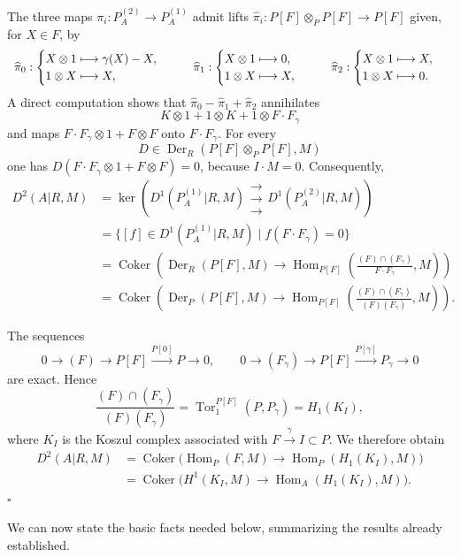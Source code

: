 The three maps
$\pi_i:P_A^{(2)}\longrightarrow P_A^{(1)}$ admit lifts
$\widehat\pi_i:P[F]\otimes_PP[F]\longrightarrow P[F]$ given, for
$X\in F$, by
\[
\begin{array}{c@{\qquad}c@{\qquad}c}
\widehat\pi_0:
\begin{cases}
 X\otimes1\longmapsto\gamma(X)-X,\\
 1\otimes X\longmapsto X,
\end{cases}
&
\widehat\pi_1:
\begin{cases}
 X\otimes1\longmapsto0,\\
 1\otimes X\longmapsto X,
\end{cases}
&
\widehat\pi_2:
\begin{cases}
 X\otimes1\longmapsto X,\\
 1\otimes X\longmapsto0.
\end{cases}
\end{array}
\]
A direct computation shows that
$\widehat\pi_0-\widehat\pi_1+\widehat\pi_2$ annihilates
\[
 K\otimes1+1\otimes K+1\otimes F\cdot F_\gamma
\]
and maps
$F\cdot F_\gamma\otimes1+F\otimes F$ onto
$F\cdot F_\gamma$. For every
\[
 D\in\operatorname{Der}_R(P[F]\otimes_PP[F],M)
\]
one has
$D(F\cdot F_\gamma\otimes1+F\otimes F)=0$, because $I\cdot M=0$.
Consequently,
\begin{align*}
D^2(A|R,M)
 &=\ker\left(
   D^1(P_A^{(1)}|R,M)
   \mathrel{\substack{\longrightarrow\\[-.6ex]\longrightarrow\\[-.6ex]\longrightarrow}}
   D^1(P_A^{(2)}|R,M)\right)\\
 &=\{[f]\in D^1(P_A^{(1)}|R,M)
       \mid f(F\cdot F_\gamma)=0\}\\
 &=\operatorname{Coker}\left(
   \operatorname{Der}_R(P[F],M)\longrightarrow
   \operatorname{Hom}_{P[F]}
   \left(\frac{(F)\cap(F_\gamma)}{F\cdot F_\gamma},M\right)
   \right)\\
 &=\operatorname{Coker}\left(
   \operatorname{Der}_P(P[F],M)\longrightarrow
   \operatorname{Hom}_{P[F]}
   \left(\frac{(F)\cap(F_\gamma)}{(F)(F_\gamma)},M\right)
   \right).
\end{align*}

The sequences
\[
 0\longrightarrow(F)\longrightarrow P[F]
 \xrightarrow{P[0]}P\longrightarrow0,
 \qquad
 0\longrightarrow(F_\gamma)\longrightarrow P[F]
 \xrightarrow{P[\gamma]}P_\gamma\longrightarrow0
\]
are exact. Hence
\[
 \frac{(F)\cap(F_\gamma)}{(F)(F_\gamma)}
 =\operatorname{Tor}_1^{P[F]}(P,P_\gamma)
 =H_1(K_I),
\]
where $K_I$ is the Koszul complex associated with
$F\xrightarrow{\gamma}I\subset P$. We therefore obtain
\begin{align*}
D^2(A|R,M)
 &=\operatorname{Coker}\bigl(
   \operatorname{Hom}_P(F,M)\longrightarrow
   \operatorname{Hom}_P(H_1(K_I),M)\bigr)\\
 &=\operatorname{Coker}\bigl(
   H^1(K_I,M)\longrightarrow
   \operatorname{Hom}_A(H_1(K_I),M)\bigr).
\end{align*}
\hfill$\square$

We can now state the basic facts needed below, summarizing the
results already established.
